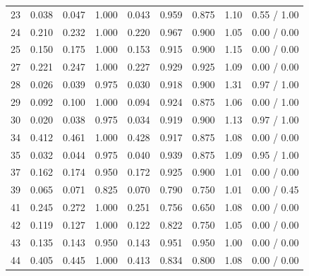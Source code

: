 \begin{longtable}{rcccccccc}
23 & 0.038 & 0.047 & 1.000 & 0.043 & 0.959 & 0.875 & 1.10 & 0.55 / 1.00\\
24 & 0.210 & 0.232 & 1.000 & 0.220 & 0.967 & 0.900 & 1.05 & 0.00 / 0.00\\
25 & 0.150 & 0.175 & 1.000 & 0.153 & 0.915 & 0.900 & 1.15 & 0.00 / 0.00\\
27 & 0.221 & 0.247 & 1.000 & 0.227 & 0.929 & 0.925 & 1.09 & 0.00 / 0.00\\
28 & 0.026 & 0.039 & 0.975 & 0.030 & 0.918 & 0.900 & 1.31 & 0.97 / 1.00\\
29 & 0.092 & 0.100 & 1.000 & 0.094 & 0.924 & 0.875 & 1.06 & 0.00 / 1.00\\
30 & 0.020 & 0.038 & 0.975 & 0.034 & 0.919 & 0.900 & 1.13 & 0.97 / 1.00\\
34 & 0.412 & 0.461 & 1.000 & 0.428 & 0.917 & 0.875 & 1.08 & 0.00 / 0.00\\
35 & 0.032 & 0.044 & 0.975 & 0.040 & 0.939 & 0.875 & 1.09 & 0.95 / 1.00\\
37 & 0.162 & 0.174 & 0.950 & 0.172 & 0.925 & 0.900 & 1.01 & 0.00 / 0.00\\
39 & 0.065 & 0.071 & 0.825 & 0.070 & 0.790 & 0.750 & 1.01 & 0.00 / 0.45\\
41 & 0.245 & 0.272 & 1.000 & 0.251 & 0.756 & 0.650 & 1.08 & 0.00 / 0.00\\
42 & 0.119 & 0.127 & 1.000 & 0.122 & 0.822 & 0.750 & 1.05 & 0.00 / 0.00\\
43 & 0.135 & 0.143 & 0.950 & 0.143 & 0.951 & 0.950 & 1.00 & 0.00 / 0.00\\
44 & 0.405 & 0.445 & 1.000 & 0.413 & 0.834 & 0.800 & 1.08 & 0.00 / 0.00\\
\bottomrule
\end{longtable}
